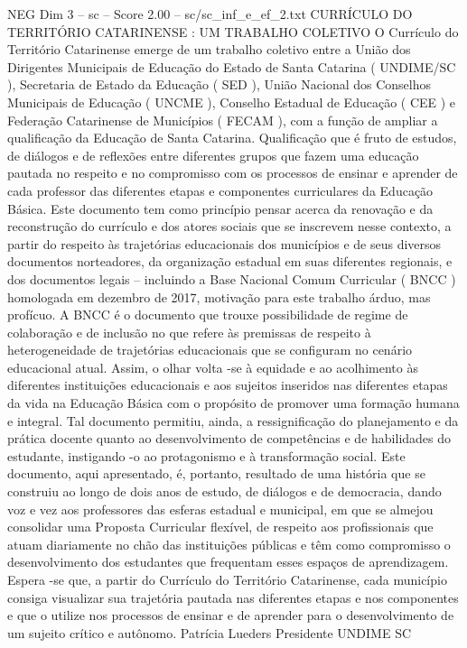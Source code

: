 \begin{textsample}{NEG Dim 3 – sc – Score 2.00 – sc/sc\_inf\_e\_ef\_2.txt}  \label{ex:f3_neg_225}
CURRÍCULO DO TERRITÓRIO CATARINENSE : UM TRABALHO COLETIVO O Currículo do Território Catarinense emerge de um trabalho coletivo entre a União dos Dirigentes Municipais de Educação do Estado de Santa Catarina ( UNDIME/SC ), Secretaria de Estado da Educação ( SED ), União Nacional dos Conselhos Municipais de Educação ( UNCME ), Conselho Estadual de Educação ( CEE ) e Federação Catarinense de Municípios ( FECAM ), com a função de ampliar a qualificação da Educação de Santa Catarina.
Qualificação que é fruto de estudos, de diálogos e de reflexões entre diferentes grupos que fazem uma educação pautada no respeito e no compromisso com os processos de ensinar e aprender de cada professor das diferentes etapas e componentes curriculares da Educação Básica.
Este documento tem como princípio pensar acerca da renovação e da reconstrução do currículo e dos atores sociais que se inscrevem nesse contexto, a partir do respeito às trajetórias educacionais dos municípios e de seus diversos documentos norteadores, da organização estadual em suas diferentes regionais, e dos documentos legais – incluindo a Base Nacional Comum Curricular ( BNCC ) homologada em dezembro de 2017, motivação para este trabalho árduo, mas profícuo.
A BNCC é o documento que trouxe possibilidade de regime de colaboração e de inclusão no que refere às premissas de respeito à heterogeneidade de trajetórias educacionais que se configuram no cenário educacional atual.
Assim, o olhar volta -se à equidade e ao acolhimento às diferentes instituições educacionais e aos sujeitos inseridos nas diferentes etapas da vida na Educação Básica com o propósito de promover uma formação humana e integral.
Tal documento permitiu, ainda, a ressignificação do planejamento e da prática docente quanto ao desenvolvimento de competências e de habilidades do estudante, instigando -o ao protagonismo e à transformação social.
Este documento, aqui apresentado, é, portanto, resultado de uma história que se construiu ao longo de dois anos de estudo, de diálogos e de democracia, dando voz e vez aos professores das esferas estadual e municipal, em que se almejou consolidar uma Proposta Curricular flexível, de respeito aos profissionais que atuam diariamente no chão das instituições públicas e têm como compromisso o desenvolvimento dos estudantes que frequentam esses espaços de aprendizagem.
Espera -se que, a partir do Currículo do Território Catarinense, cada município consiga visualizar sua trajetória pautada nas diferentes etapas e nos componentes e que o utilize nos processos de ensinar e de aprender para o desenvolvimento de um sujeito crítico e autônomo.
Patrícia Lueders Presidente UNDIME SC

\end{textsample}

